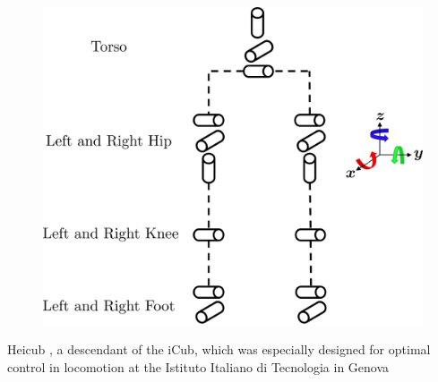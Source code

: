 \begin{figure}[h!]
	[.4\linewidth]{\includegraphics[scale=.3]{chapters/03_methods/img/kinematic_tree.png}}
	\caption{}
	\label{fig::34_hei}
\end{figure}

Heicub , a descendant of the iCub, which was especially designed for optimal control in locomotion at the Istituto Italiano di Tecnologia in Genova
\FloatBarrier
